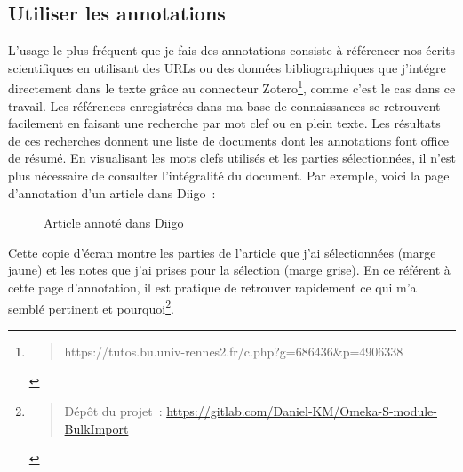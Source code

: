 \documentclass[
  a4paper,
  DIV=11,
  numbers=noendperiod]{scrreprt}
\begin{document}
\subsection{Utiliser les annotations}\label{sec-utiliserAnnotations}

L'usage le plus fréquent que je fais des annotations consiste à
référencer nos écrits scientifiques en utilisant des URLs ou des données
bibliographiques que j'intégre directement dans le texte grâce au
connecteur Zotero\footnote{\begin{quote}
  https://tutos.bu.univ-rennes2.fr/c.php?g=686436\&p=4906338
  \end{quote}}, comme c'est le cas dans ce travail. Les références
enregistrées dans ma base de connaissances se retrouvent facilement en
faisant une recherche par mot clef ou en plein texte. Les résultats de
ces recherches donnent une liste de documents dont les annotations font
office de résumé. En visualisant les mots clefs utilisés et les parties
sélectionnées, il n'est plus nécessaire de consulter l'intégralité du
document. Par exemple, voici la page d'annotation d'un article dans
Diigo~:

\begin{figure}


\caption{\label{fig-annotationDiigo}Article annoté dans Diigo}

\end{figure}%

Cette copie d'écran montre les parties de l'article que j'ai
sélectionnées (marge jaune) et les notes que j'ai prises pour la
sélection (marge grise). En ce référent à cette page d'annotation, il
est pratique de retrouver rapidement ce qui m'a semblé pertinent et
pourquoi\footnote{\begin{quote}
  Dépôt du projet~:
  \url{https://gitlab.com/Daniel-KM/Omeka-S-module-BulkImport}
  \end{quote}}.
\end{document}
